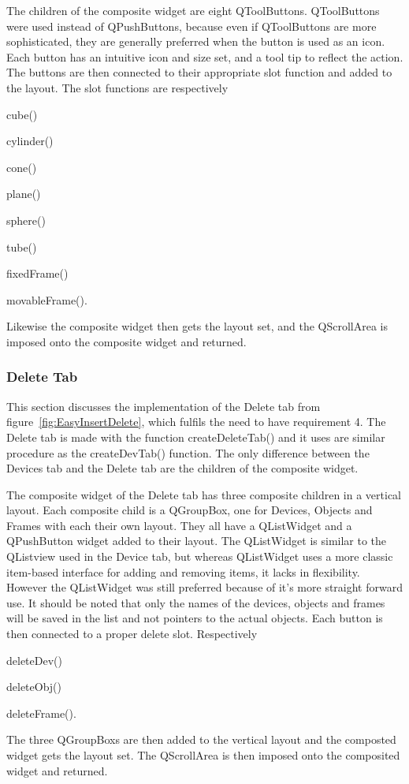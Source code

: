 The children of the composite widget are eight QToolButtons. QToolButtons were used instead of QPushButtons, because even if QToolButtons are more sophisticated, they are generally preferred when the button is used as an icon. Each button has an intuitive icon and size set, and a tool tip to reflect the action. The buttons are then connected to their appropriate slot function and added to the layout. The slot functions are respectively \begin{enumerate*}[font={\color{red!50!black}\bfseries}]
\item cube()
\item cylinder()
\item cone()
\item plane()
\item sphere()
\item tube()
\item fixedFrame()
\item movableFrame().
\end{enumerate*}    
Likewise the composite widget then gets the layout set, and the QScrollArea is imposed onto the composite widget and returned.

\subsubsection{Delete Tab}
\label{sec:DelTab}

This section discusses the implementation of the Delete tab from figure~\ref{fig:EasyInsertDelete}, which fulfils the need to have requirement 4. The Delete tab is made with the function createDeleteTab() and it uses are similar procedure as the createDevTab() function. The only difference between the Devices tab and the Delete tab are the children of the composite widget.

The composite widget of the Delete tab has three composite children in a vertical layout. Each composite child is a QGroupBox, one for Devices, Objects and Frames with each their own layout. They all have a QListWidget and a QPushButton widget added to their layout. The QListWidget is similar to the QListview used in the Device tab, but whereas QListWidget uses a more classic item-based interface for adding and removing items, it lacks in flexibility. However the QListWidget was still preferred because of it's more straight forward use. It should be noted that only the names of the devices, objects and frames will be saved in the list and not pointers to the actual objects. Each button is then connected to a proper delete slot. Respectively \begin{enumerate*}[font={\color{red!50!black}\bfseries}]
\item deleteDev()
\item deleteObj()
\item deleteFrame().
\end{enumerate*} 
The three QGroupBoxs are then added to the vertical layout and the composted widget gets the layout set. The QScrollArea is then imposed onto the composited widget and returned.

